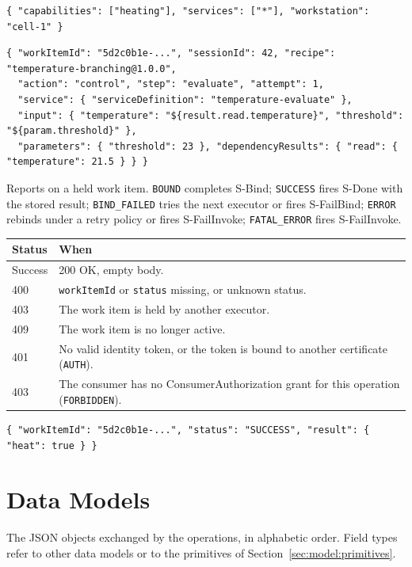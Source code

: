 \documentclass[a4paper]{arrowhead}
\begin{document}
\begin{lstlisting}[caption={Example request body}]
{ "capabilities": ["heating"], "services": ["*"], "workstation": "cell-1" }
\end{lstlisting}


\begin{lstlisting}[caption={Example response body}]
{ "workItemId": "5d2c0b1e-...", "sessionId": 42, "recipe": "temperature-branching@1.0.0",
  "action": "control", "step": "evaluate", "attempt": 1,
  "service": { "serviceDefinition": "temperature-evaluate" },
  "input": { "temperature": "${result.read.temperature}", "threshold": "${param.threshold}" },
  "parameters": { "threshold": 23 }, "dependencyResults": { "read": { "temperature": 21.5 } } }
\end{lstlisting}

Reports on a held work item. \texttt{BOUND} completes S-Bind; \texttt{SUCCESS} fires S-Done with the stored result; \texttt{BIND\_FAILED} tries the next executor or fires S-FailBind; \texttt{ERROR} rebinds under a retry policy or fires S-FailInvoke; \texttt{FATAL\_ERROR} fires S-FailInvoke.

{\small
\begin{longtable}{|p{2.0cm}|p{13.8cm}|}

\hline
\rowcolor{gray!33} Status & When \\ \hline
\endhead
Success & 200 OK, empty body. \\ \hline
400 & \texttt{workItemId} or \texttt{status} missing, or unknown status. \\ \hline
403 & The work item is held by another executor. \\ \hline
409 & The work item is no longer active. \\ \hline
401 & No valid identity token, or the token is bound to another certificate (\texttt{AUTH}). \\ \hline
403 & The consumer has no ConsumerAuthorization grant for this operation (\texttt{FORBIDDEN}). \\ \hline
\end{longtable}
}


\begin{lstlisting}[caption={Example request body}]
{ "workItemId": "5d2c0b1e-...", "status": "SUCCESS", "result": { "heat": true } }
\end{lstlisting}


\newpage
\section{Data Models}
\label{sec:model}
The JSON objects exchanged by the operations, in alphabetic order. Field types refer to other data models or to the
primitives of Section~\ref{sec:model:primitives}.
\end{document}
